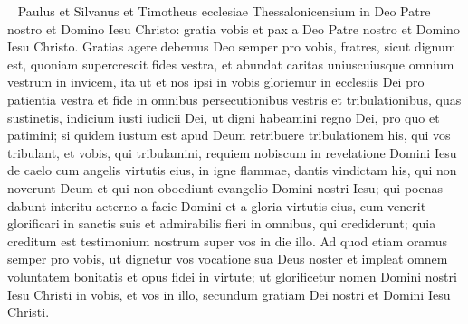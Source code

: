 
\begin{biblechapter}  
\verse Paulus et Silvanus et Timotheus ecclesiae Thessalonicensium in Deo Patre nostro et Domino Iesu Christo: 
\verse gratia vobis et pax a Deo Patre nostro et Domino Iesu Christo. 
\verse Gratias agere debemus Deo semper pro vobis, fratres, sicut dignum est, quoniam supercrescit fides vestra, et abundat caritas uniuscuiusque omnium vestrum in invicem, 
\verse ita ut et nos ipsi in vobis gloriemur in ecclesiis Dei pro patientia vestra et fide in omnibus persecutionibus vestris et tribulationibus, quas sustinetis, 
\verse indicium iusti iudicii Dei, ut digni habeamini regno Dei, pro quo et patimini; 
\verse si quidem iustum est apud Deum retribuere tribulationem his, qui vos tribulant, 
\verse et vobis, qui tribulamini, requiem nobiscum in revelatione Domini Iesu de caelo cum angelis virtutis eius, 
\verse in igne flammae, dantis vindictam his, qui non noverunt Deum et qui non oboediunt evangelio Domini nostri Iesu; 
\verse qui poenas dabunt interitu aeterno a facie Domini et a gloria virtutis eius,  
\verse cum venerit glorificari in sanctis suis et admirabilis fieri in omnibus, qui crediderunt; quia creditum est testimonium nostrum super vos in die illo. 
\verse Ad quod etiam oramus semper pro vobis, ut dignetur vos vocatione sua Deus noster et impleat omnem voluntatem bonitatis et opus fidei in virtute;  
\verse ut glorificetur nomen Domini nostri Iesu Christi in vobis, et vos in illo, secundum gratiam Dei nostri et Domini Iesu Christi. 
\end{biblechapter}

